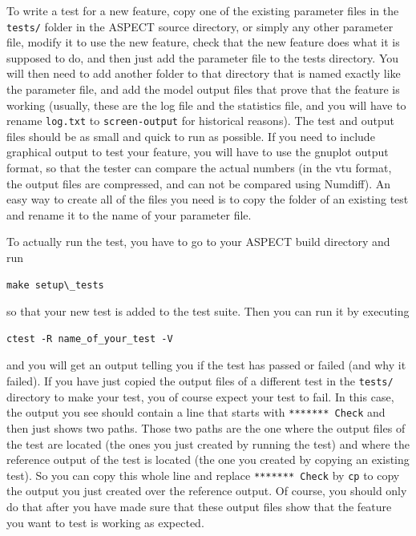 \documentclass{article}
\newcommand{\aspect}{\textsc{ASPECT}}
\begin{document}
To write a test for a new feature, copy one of the existing parameter files in
the \texttt{tests/} folder in the \aspect{} source directory, or simply any other 
parameter file, modify it to use the new feature, check that the
new feature does what it is supposed to do, and then just add the parameter file to
the tests directory. You will then need to add another folder to that directory
that is named exactly like the parameter file, and add the model output files that
prove that the feature is working (usually, these are the log file and the statistics 
file, and you will have to rename \texttt{log.txt} to
\texttt{screen-output} for historical reasons). The test and output files should
be as small and quick to run as possible. If you need to include graphical output to 
test your feature, you will have to use the gnuplot output format, so that the tester 
can compare the actual numbers (in the vtu format, the output files are compressed, 
and can not be compared using Numdiff). 
An easy way to create all of the files you need is to copy the folder of an existing 
test and rename it to the name of your parameter file. 

To actually run the test, you have to go to your \aspect{} build directory and run 
\begin{lstlisting}[frame=single,language=ksh] 
    make setup\_tests
\end{lstlisting}
so that your new test is added to the test suite. Then you can run it by executing 
\begin{lstlisting}[frame=single,language=ksh] 
    ctest -R name_of_your_test -V
\end{lstlisting}
and you will get an output telling you if the test has 
passed or failed (and why it failed). If you have just copied the output files of a different 
test in the \texttt{tests/} directory to make your test, you of course expect your test to fail. 
In this case, the output you see should contain a line that starts with \texttt{******* Check} 
and then just shows two paths. Those two paths are the one where the output files of the test 
are located (the ones you just created by running the test) and where the reference output of the 
test is located (the one you created by copying an existing test). So you can copy this whole line
and replace \texttt{******* Check} by \texttt{cp} to copy the output you just created over the 
reference output. Of course, you should only do that after you have made sure that these output 
files show that the feature you want to test is working as expected. 
\end{document}
